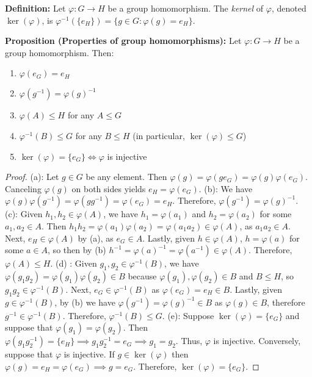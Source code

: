 \documentclass[12pt]{article}
\newcommand{\vs}{\vskip10pt}
\begin{document}
	\vs 
	
	\textbf{Definition: } Let $\varphi: G \rightarrow H$ be a group homomorphism. The \textit{kernel} of $\varphi$, denoted $\ker(\varphi)$, is $\varphi^{-1} (\{e_H\}) = \{g \in G : \varphi(g) = e_H\}$.
	
	\vs 
	
	\textbf{Proposition (Properties of group homomorphisms): } Let $\varphi: G \rightarrow H$ be a group homomorphism. Then:
	
	\begin{enumerate} [label = (\alph*)]
		\item $\varphi(e_G) = e_H$
		\item $\varphi(g^{-1}) = \varphi(g)^{-1}$
		\item $\varphi(A) \leq H$ for any $A \leq G$
		\item $\varphi^{-1}(B) \leq G$ for any $B \leq H$ (in particular, $\ker(\varphi) \leq G$)
		\item $\ker(\varphi) = \{e_G\} \iff \varphi$ is injective
	\end{enumerate}

	\begin{proof}
		
	(a): Let $g \in G$ be any element. Then $\varphi(g) = \varphi(ge_G) = \varphi(g) \varphi(e_G)$. Canceling $\varphi(g)$ on both sides yields $e_H = \varphi(e_G)$. 
	\vs
	(b): We have $\varphi(g) \varphi(g^{-1}) = \varphi(g g^{-1}) = \varphi(e_G) = e_H$. Therefore, $\varphi(g^{-1}) = \varphi(g)^{-1}$. 
	\vs
	(c): Given $h_1, h_2 \in \varphi(A)$, we have $h_1 = \varphi(a_1)$ and $h_2 = \varphi(a_2)$ for some $a_1, a_2 \in A$. Then $h_1 h_2 = \varphi(a_1) \varphi(a_2) = \varphi(a_1 a_2) \in \varphi(A)$, as $a_1a_2 \in A$. Next, $e_H \in \varphi(A)$ by (a), as $e_G \in A$. Lastly, given $h \in \varphi(A)$, $h = \varphi(a)$ for some $a \in A$, so then by (b) $h^{-1} = \varphi(a)^{-1} = \varphi(a^{-1}) \in \varphi(A)$. Therefore, $\varphi(A) \leq H$. 
	\vs
	(d) : Given $g_1, g_2 \in \varphi^{-1}(B)$, we have $\varphi(g_1 g_2) = \varphi(g_1) \varphi(g_2) \in B$ because $\varphi(g_1), \varphi(g_2) \in B$ and $B \leq H$, so $g_1 g_2 \in \varphi^{-1}(B)$. Next, $e_G \in \varphi^{-1}(B)$ as $\varphi(e_G) = e_H \in B$. Lastly, given $g \in \varphi^{-1}(B)$, by (b) we have $\varphi(g^{-1}) = \varphi(g)^{-1} \in B$ as $\varphi(g) \in B$, therefore $g^{-1} \in \varphi^{-1}(B)$. Therefore, $\varphi^{-1}(B) \leq G$. 
	\vs 
	(e): Suppose $\ker(\varphi) = \{e_G\}$ and suppose that $\varphi(g_1) = \varphi(g_2)$. Then $\varphi(g_1 g_2^{-1}) = \{e_H\} \implies g_1 g_2^{-1} = e_G \implies g_1 = g_2$. Thus, $\varphi$ is injective. Conversely, suppose that $\varphi$ is injective. If $g \in \ker(\varphi)$ then $\varphi(g) = e_H = \varphi(e_G) \implies g = e_G$. Therefore, $\ker(\varphi) = \{e_G\}$. 
 		
	\end{proof}
	
\end{document}
